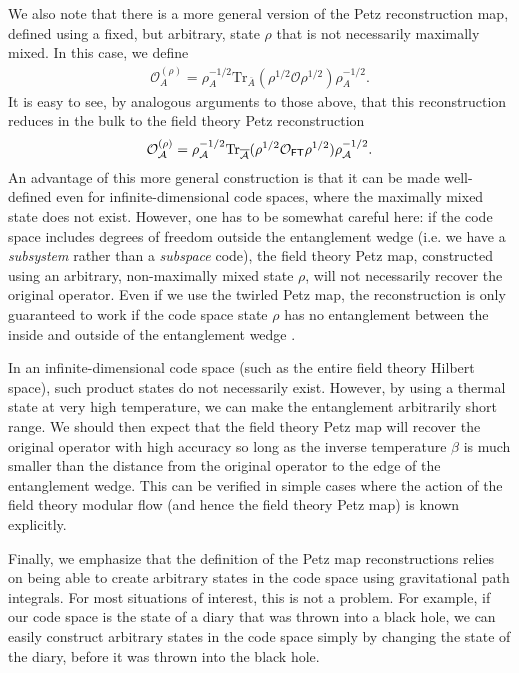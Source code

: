 \documentclass[12pt]{article}
\numberwithin{equation}{section}
\def\tr{\text{Tr}}
\begin{document}
We also note that there is a more general version of the Petz reconstruction map, defined using a fixed, but arbitrary, state $\rho$ that is not necessarily maximally mixed. In this case, we define
\begin{align}
\mathcal{O}_A^{(\rho)} =\rho_A^{-1/2}\tr_{\overline A}(\rho^{1/2} \mathcal{O} \rho^{1/2})\rho_A^{-1/2}.
\end{align}
It is easy to see, by analogous arguments to those above, that this reconstruction reduces in the bulk to the field theory Petz reconstruction
\begin{align}
\mathcal{O}_{\mathcal{A}}^{(\rho)} = \rho_{\mathcal{A}}^{-1/2} \tr_{\overline{\mathcal{A}}}(\rho^{1/2}\mathcal{O}_{\sf{FT}}\rho^{1/2})\rho_{\mathcal{A}}^{-1/2}.
\end{align}
An advantage of this more general construction is that it can be made well-defined even for infinite-dimensional code spaces, where the maximally mixed state does not exist. However, one has to be somewhat careful here: if the code space includes degrees of freedom outside the entanglement wedge (i.e. we have a \emph{subsystem} rather than a \emph{subspace} code), the field theory Petz map, constructed using an arbitrary, non-maximally mixed state $\rho$, will not necessarily recover the original operator. Even if we use the twirled Petz map, the reconstruction is only guaranteed to work if the code space state $\rho$ has no entanglement between the inside and outside of the entanglement wedge \cite{Cotler:2017erl}.

In an infinite-dimensional code space (such as the entire field theory Hilbert space), such product states do not necessarily exist. However, by using a thermal state at very high temperature, we can make the entanglement arbitrarily short range. We should then expect that the field theory Petz map will recover the original operator with high accuracy so long as the inverse temperature $\beta$ is much smaller than the distance from the original operator to the edge of the entanglement wedge. This can be verified in simple cases where the action of the field theory modular flow (and hence the field theory Petz map) is known explicitly.

Finally, we emphasize that the definition of the Petz map reconstructions relies on being able to create arbitrary states in the code space using gravitational path integrals. For most situations of interest, this is not a problem. For example, if our code space is the state of a diary that was thrown into a black hole, we can easily construct arbitrary states in the code space simply by changing the state of the diary, before it was thrown into the black hole.
\end{document}
